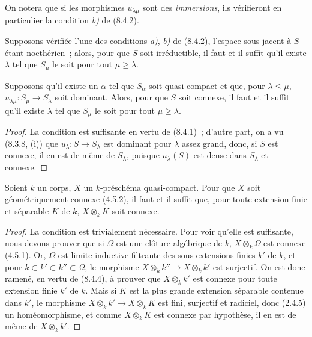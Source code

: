 On notera que si les morphismes $u_{\lambda\mu}$ sont des \emph{immersions},
ils vérifieront en particulier la condition \emph{b)} de (8.4.2).

\begin{corollary}[8.4.3]
\label{IV.8.4.3-fr}
Supposons vérifiée l'une des conditions \emph{a)}, \emph{b)} de (8.4.2),
l'espace sous-jacent à $S$ étant noethérien~; alors, pour que $S$ soit
irréductible, il faut et il suffit qu'il existe $\lambda$ tel que $S_\mu$ le
soit pour tout $\mu\geq\lambda$.
\end{corollary}

\begin{proposition}[8.4.4]
\label{IV.8.4.4-fr}
Supposons qu'il existe un $\alpha$ tel que $S_\alpha$ soit quasi-compact et
que, pour $\lambda\leq\mu$, $u_{\lambda\mu}:S_\mu\to S_\lambda$ soit dominant.
Alors, pour que $S$ soit connexe, il faut et il suffit qu'il existe $\lambda$
tel que $S_\mu$ le soit pour tout $\mu\geq\lambda$.
\end{proposition}

\begin{proof}
La condition est suffisante en vertu de (8.4.1)~; d'autre part, on a vu
(8.3.8, (i)) que $u_\lambda:S\to S_\lambda$ est dominant pour $\lambda$ assez
grand, donc, si $S$ est connexe, il en est de même de $S_\lambda$, puisque
$u_\lambda(S)$ est dense dans $S_\lambda$ et connexe.
\end{proof}

\begin{corollary}[8.4.5]
\label{IV.8.4.5-fr}
Soient $k$ un corps, $X$ un $k$-préschéma quasi-compact. Pour que $X$ soit
géométriquement connexe (4.5.2), il faut et il suffit que, pour toute extension
finie et séparable $K$ de $k$, $X\otimes_k K$ soit connexe.
\end{corollary}

\begin{proof}
La condition est trivialement nécessaire. Pour voir qu'elle est suffisante,
nous devons prouver que si $\Omega$ est une clôture algébrique de $k$,
$X\otimes_k\Omega$ est connexe (4.5.1). Or, $\Omega$ est limite inductive
filtrante des sous-extensions finies $k'$ de $k$, et pour
$k\subset k'\subset k''\subset\Omega$, le morphisme
$X\otimes_k k''\to X\otimes_k k'$ est surjectif. On est donc ramené, en vertu
de (8.4.4), à prouver que $X\otimes_k k'$ est connexe pour toute extension
finie $k'$ de $k$. Mais si $K$ est la plus grande extension séparable contenue
dans $k'$, le morphisme $X\otimes_k k'\to X\otimes_k K$ est fini, surjectif et
radiciel, donc (2.4.5) un homéomorphisme, et comme $X\otimes_k K$ est connexe
par hypothèse, il en est de même de $X\otimes_k k'$.
\end{proof}

